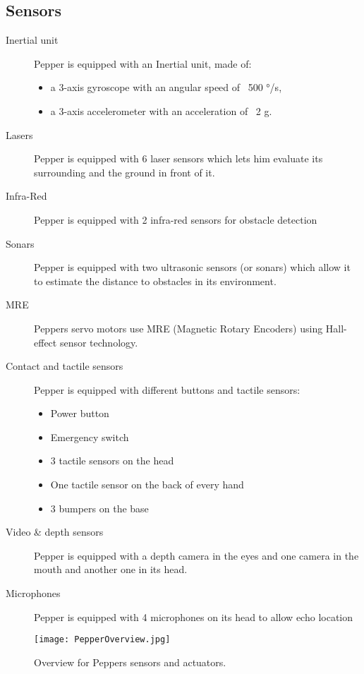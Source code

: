 \subsection*{Sensors}
\begin{description}
  \item [Inertial unit] Pepper is equipped with an Inertial unit, made of:
    \begin{itemize}
      \item a 3-axis gyroscope with an angular speed of ~500 °/s,
      \item a 3-axis accelerometer with an acceleration of ~2 g.
    \end{itemize}
  \item [Lasers] Pepper is equipped with 6 laser sensors which lets him evaluate its surrounding and the ground in front of it.
  \item [Infra-Red] Pepper is equipped with 2 infra-red sensors for obstacle detection
  \item [Sonars] Pepper is equipped with two ultrasonic sensors (or sonars) which allow it to estimate the distance to obstacles in its environment.
  \item [MRE] Peppers servo motors use MRE (Magnetic Rotary Encoders) using Hall-effect sensor technology.
  \item [Contact and tactile sensors] Pepper is equipped with different buttons and tactile sensors:
    \begin{itemize}
      \item Power button
      \item Emergency switch
      \item 3 tactile sensors on the head
      \item One tactile sensor on the back of every hand
      \item 3 bumpers on the base
    \end{itemize}
  \item [Video \& depth sensors] Pepper is equipped with a depth camera in the eyes and one camera in the mouth and another one in its head.
  \item [Microphones] Pepper is equipped with 4 microphones on its head to allow echo location
\end{description}

\begin{figure}
  \centering
  \texttt{[image: PepperOverview.jpg]}
  \caption{Overview for Peppers sensors and actuators. \cite{pepperOverview}}
  \label{fig:pepperOverview}
\end{figure}

